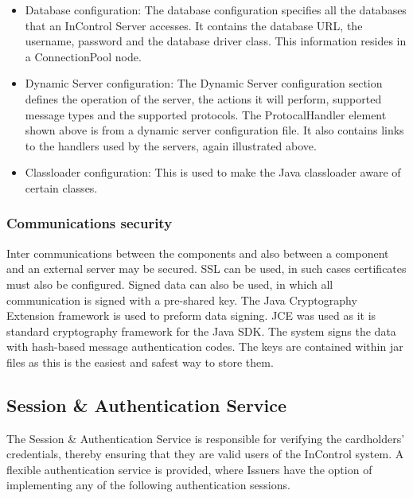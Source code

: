 \documentclass[a4paper, 11pt, titlepage]{article}
\begin{document}
\begin{itemize}
\begin{verbatim}
    <param name = "Append" value = "false"/> 
    <param name = "Encoding" value = "UTF-8" /> 
    <layout class = "org.apache.log4j.PatternLayout"> 
        <param name = "ConversionPattern" 
            value = "%d{dd,MM HH:mm:ss:SSS} [%t] %-5p %c{2} - %m\n"/> 
    </layout> 
</appender> 
\end{verbatim} 
\item Database configuration: The database configuration specifies all the databases that an InControl Server accesses. It contains the database URL, the username, password and the database driver class. This information resides in a ConnectionPool node.  
\item Dynamic Server configuration: The Dynamic Server configuration section defines the operation of the server, the actions it will perform, supported message types and the supported protocols. The ProtocalHandler element shown above is from a dynamic server configuration file. It also contains links to the handlers used by the servers, again illustrated above. 
\item Classloader configuration: This is used to make the Java classloader aware of certain classes.
\end{itemize} 
\subsubsection{Communications security} 
Inter communications between the components and also between a component and an external server may be secured. SSL can be used, in such cases certificates must also be configured. Signed data can also be used, in which all communication is signed with a pre-shared key. The Java Cryptography Extension framework is used to preform data signing. JCE was used as it is standard cryptography framework for the Java SDK. The system signs the data with hash-based message authentication codes. The keys are contained within jar files as this is the easiest and safest way to store them. 
 
\subsection{Session \& Authentication Service} 
The Session \& Authentication Service is responsible for verifying the cardholders’ credentials, thereby ensuring that they are valid users of the InControl system. 
A flexible authentication service is provided, where Issuers have the option of implementing any of the following authentication sessions. 
 
\end{document}
